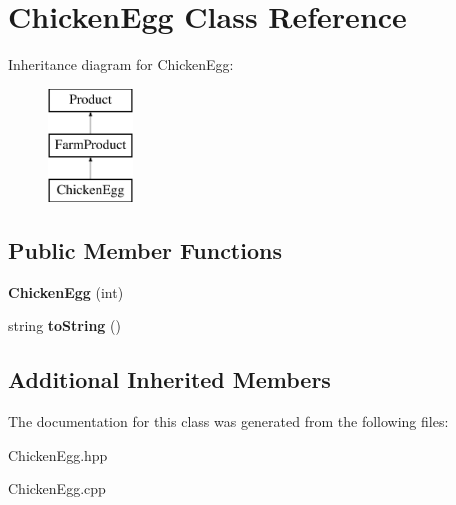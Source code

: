 \hypertarget{class_chicken_egg}{}\section{Chicken\+Egg Class Reference}
\label{class_chicken_egg}
Inheritance diagram for Chicken\+Egg\+:\begin{figure}[H]
\begin{center}
\leavevmode
\includegraphics[height=3.000000cm]{class_chicken_egg}
\end{center}
\end{figure}
\subsection*{Public Member Functions}
\begin{DoxyCompactItemize}
\item 
\mbox{\label{class_chicken_egg_a6c8da6e4ef508960cccef7ba4e89f788}} 
{\bfseries Chicken\+Egg} (int)
\item 
\mbox{\label{class_chicken_egg_ab079c19ee06a1c9a8df9b2bdffeb4d0d}} 
string {\bfseries to\+String} ()
\end{DoxyCompactItemize}
\subsection*{Additional Inherited Members}


The documentation for this class was generated from the following files\+:\begin{DoxyCompactItemize}
\item 
Chicken\+Egg.\+hpp\item 
Chicken\+Egg.\+cpp\end{DoxyCompactItemize}
